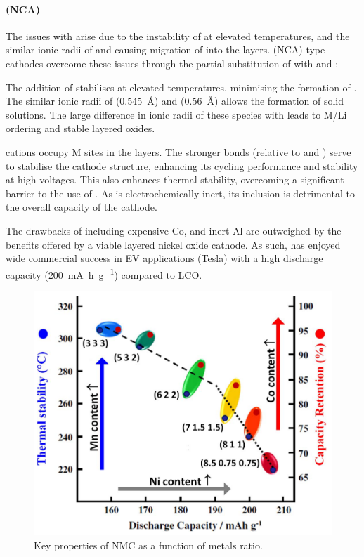 \paragraph{ (NCA)}
The issues with  arise due to the instability of  at elevated temperatures, and the similar ionic radii of  and  causing migration of  into the  layers.\cite{Das2017}
 (NCA) type cathodes overcome these issues through the partial substitution of  with  and :
\begin{labeling}{\textbf{}}
\item [\textbf{\ce{Co^3+}}] The addition of  stabilises  at elevated temperatures, minimising the formation of .
The similar ionic radii of  (\SI{0.545}{\angstrom}) and  (\SI{0.56}{\angstrom}) allows the formation of  solid solutions.\cite{Rozier2015}
The large difference in ionic radii of these species with  leads to M/Li ordering and stable layered oxides.

\item [\textbf{\ce{Al^3+}}]  cations occupy M sites in the  layers.
The stronger  bonds (relative to  and ) serve to stabilise the cathode structure, enhancing its cycling performance and stability at high voltages.
This also enhances thermal stability, overcoming a significant barrier to the use of .
As  is electrochemically inert, its inclusion is detrimental to the overall capacity of the cathode.
\end{labeling}

The drawbacks of including expensive Co, and inert Al are outweighed by the benefits offered by a viable layered nickel oxide cathode.
As such,  has enjoyed wide commercial success in EV applications (Tesla) with a high discharge capacity (\SI{200}{\milli\ampere\hour\per\gram}) compared to LCO.
\cite{Nitta2015}



\newpage

\begin{figure}
\centering
\includegraphics[width=0.5\linewidth]{figures/static/NMC_composition}

\caption{Key properties of NMC as a function of metals ratio.\cite{Rozier2015, Noh2013}} 
\label{fig:NMCcomp}
\end{figure}

